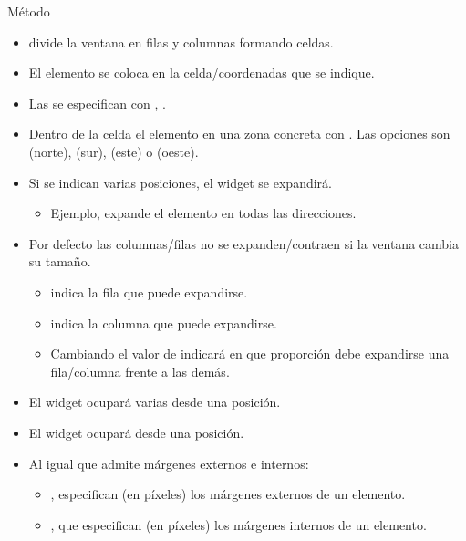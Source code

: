 \documentclass[10pt, envcountsect , spanish]{beamer}
\begin{document}
\begin{frame}{Método }

\begin{itemize} 
\item {} divide la ventana en filas y columnas formando celdas.

\item El elemento se coloca en la celda/coordenadas que se indique.

\item Las  se especifican con , .

\item Dentro de la celda el elemento  en una zona concreta con  .
Las opciones son  (norte), (sur), (este) o (oeste).

\item Si se indican varias posiciones, el widget se expandirá.
\begin{itemize}
\item Ejemplo,  expande el elemento en todas las direcciones.
\end{itemize}

\item Por defecto las columnas/filas no se expanden/contraen si la ventana cambia su tamaño. 
\begin{itemize}
\item {} indica la fila que puede expandirse.
\item {} indica la columna que puede expandirse.
\item Cambiando el valor de  indicará en que proporción debe expandirse una fila/columna frente a las demás.
\end{itemize}


\item  {} El widget ocupará  varias  desde una posición.

\item {}  El widget ocupará   desde una posición.

\item Al igual que  admite márgenes externos e internos:

\begin{itemize}
\item {},  especifican (en píxeles) los márgenes externos de un elemento.
\item {},   que especifican (en píxeles) los márgenes internos de un elemento.
\end{itemize}


\end{itemize}
\end{frame}
\end{document}

